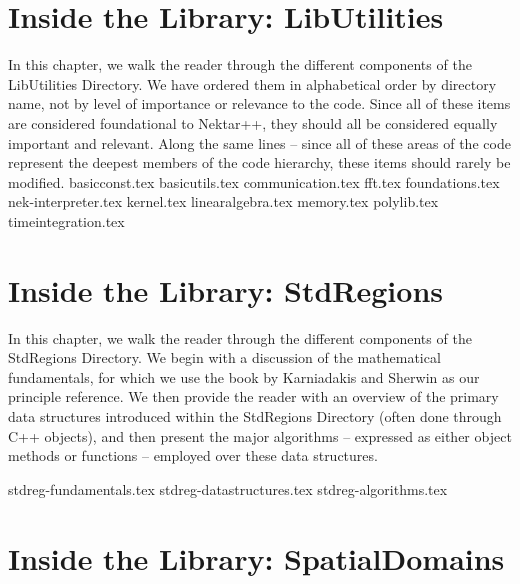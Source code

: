 
\chapter{Inside the Library: LibUtilities}

In this chapter, we walk the reader through the different components of the LibUtilities Directory.
We have ordered them in alphabetical order by directory name, not by level of importance or
relevance to the code.  Since all of these items are considered foundational to Nektar++, they
should all be considered equally important and relevant.   Along the same lines -- since all of
these areas of the code represent the deepest members of the code hierarchy, these
items should rarely be modified. 
%
{basicconst.tex}
%
{basicutils.tex}
%
{communication.tex}
%
{fft.tex}
%
{foundations.tex}
%
{nek-interpreter.tex}
%
{kernel.tex}
%
{linearalgebra.tex}
%
{memory.tex}
%
{polylib.tex}
%
{timeintegration.tex}

\chapter{Inside the Library: StdRegions}
\label{chap:stdregions}

In this chapter, we walk the reader through the different components of the StdRegions Directory.
We begin with a discussion of the mathematical fundamentals, for which we use the book
by Karniadakis and Sherwin \cite{KaSh05} as our principle reference.  We then provide
the reader with an overview of the primary data structures introduced within the
StdRegions Directory (often done through C++ objects), and then present the major 
algorithms -- expressed as either object methods or functions -- employed over these data structures.  


{stdreg-fundamentals.tex}
%
{stdreg-datastructures.tex}
%
{stdreg-algorithms.tex}


\chapter{Inside the Library: SpatialDomains}
\label{chap:spatialdomains}


